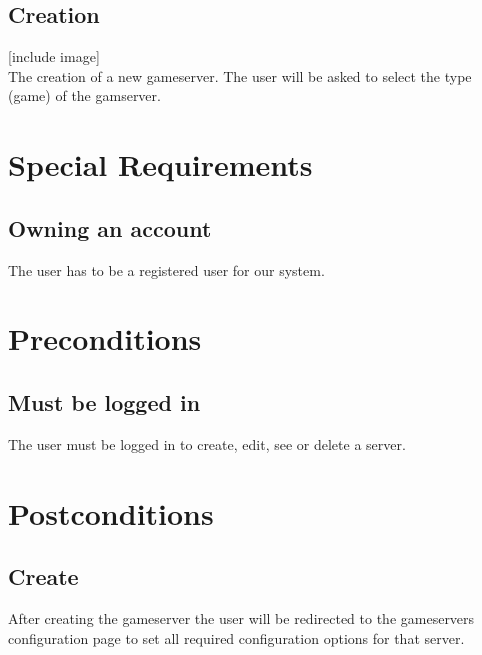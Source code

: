 \documentclass[a4paper,12pt,chapterprefix=false,bibliography=totoc,listof=totoc,book]{scrreprt}
\begin{document}
\section{Creation}
[include image]\\
The creation of a new gameserver. The user will be asked to select the type (game) of the gamserver.

\chapter{Special Requirements}

\section{Owning an account}
The user has to be a registered user for our system.

\chapter{Preconditions}
\section{Must be logged in}
The user must be logged in to create, edit, see or delete a server.

\chapter{Postconditions}

\section{Create}
After creating the gameserver the user will be redirected to the gameservers configuration page to set all required configuration options for that server.
\end{document}
